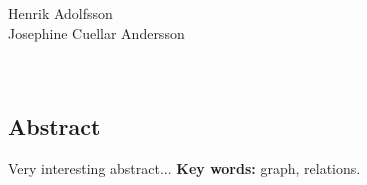 
\noindent
\thesistitle\\
\thesissubtitle\\
\whatthisis\\
\\
\large{%
    Henrik Adolfsson\\
	Josephine Cuellar Andersson\\
}\\
\\
\large{%
	\whereandwhen
}

\vspace*{\fill}
\begin{center}
    \section*{Abstract}
\end{center}
Very interesting abstract... 
\newline
\noindent
\textbf{Key words:} graph, relations.